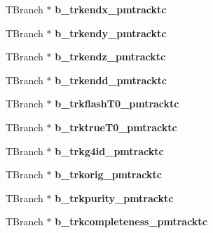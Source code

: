 \begin{DoxyCompactItemize}
\item 
\hypertarget{classanatree_a68b555e286931d3e1c36d963cf527636}{T\-Branch $\ast$ {\bfseries b\-\_\-trkendx\-\_\-pmtracktc}}\label{classanatree_a68b555e286931d3e1c36d963cf527636}

\item 
\hypertarget{classanatree_a7c2a77fff06b4b8450e3454ac3760d3b}{T\-Branch $\ast$ {\bfseries b\-\_\-trkendy\-\_\-pmtracktc}}\label{classanatree_a7c2a77fff06b4b8450e3454ac3760d3b}

\item 
\hypertarget{classanatree_aafaf3bae1ef089935fde2fb02874b623}{T\-Branch $\ast$ {\bfseries b\-\_\-trkendz\-\_\-pmtracktc}}\label{classanatree_aafaf3bae1ef089935fde2fb02874b623}

\item 
\hypertarget{classanatree_a4f78769cad9bdd6f7403bd13d704070c}{T\-Branch $\ast$ {\bfseries b\-\_\-trkendd\-\_\-pmtracktc}}\label{classanatree_a4f78769cad9bdd6f7403bd13d704070c}

\item 
\hypertarget{classanatree_af56746811c5e9d8bcee14ec22bef1c2e}{T\-Branch $\ast$ {\bfseries b\-\_\-trkflash\-T0\-\_\-pmtracktc}}\label{classanatree_af56746811c5e9d8bcee14ec22bef1c2e}

\item 
\hypertarget{classanatree_a929f7c10a224776fcb1fb4ca2be1cfb9}{T\-Branch $\ast$ {\bfseries b\-\_\-trktrue\-T0\-\_\-pmtracktc}}\label{classanatree_a929f7c10a224776fcb1fb4ca2be1cfb9}

\item 
\hypertarget{classanatree_accaf9659f3b7a1d7dcda0c45f610d5ed}{T\-Branch $\ast$ {\bfseries b\-\_\-trkg4id\-\_\-pmtracktc}}\label{classanatree_accaf9659f3b7a1d7dcda0c45f610d5ed}

\item 
\hypertarget{classanatree_a10e462f3de5a5e5c0396e26ac36ea30a}{T\-Branch $\ast$ {\bfseries b\-\_\-trkorig\-\_\-pmtracktc}}\label{classanatree_a10e462f3de5a5e5c0396e26ac36ea30a}

\item 
\hypertarget{classanatree_a581a622e79179a9c52acf71e3e768480}{T\-Branch $\ast$ {\bfseries b\-\_\-trkpurity\-\_\-pmtracktc}}\label{classanatree_a581a622e79179a9c52acf71e3e768480}

\item 
\hypertarget{classanatree_ab5c7a1ec336d298c1ea4f587e52b7fd7}{T\-Branch $\ast$ {\bfseries b\-\_\-trkcompleteness\-\_\-pmtracktc}}\label{classanatree_ab5c7a1ec336d298c1ea4f587e52b7fd7}


\end{DoxyCompactItemize}
